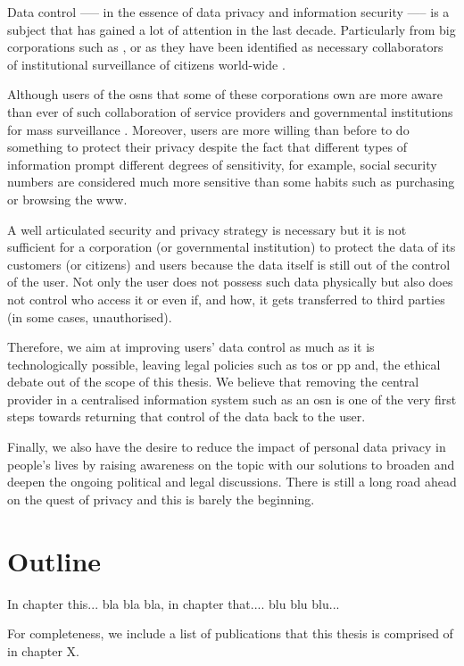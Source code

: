 \documentclass[showtrims]{kthesis}
\begin{document}
Data control —-- in the essence of data privacy and information security —-- is a 
subject that has gained a lot of attention in the last decade. Particularly from 
big corporations such as \Google, \Apple or \Facebook as they have been identified 
as necessary collaborators of institutional surveillance of citizens world-wide \cite{Lyon14}.

Although users of the \acp{osn} that some of these corporations own are more aware 
than ever of such collaboration of service providers and governmental institutions 
for mass surveillance \cite{Madden14}. Moreover, users are more willing than before 
to do something to protect their privacy despite the fact that different types of 
information prompt different degrees of sensitivity, for example, social security 
numbers are considered much more sensitive than some habits such as purchasing or 
browsing the \ac{www}.

A well articulated security and privacy strategy is necessary but it is not sufficient 
for a corporation (or governmental institution) to protect the data of its customers 
(or citizens) and users because the data itself is still out of the control of the 
user. Not only the user does not possess such data physically but also does not 
control who access it or even if, and how, it gets transferred to third parties 
(in some cases, unauthorised).

Therefore, we aim at improving users' data control as much as it is technologically 
possible, leaving legal policies such as \ac{tos} or \ac{pp} and, the ethical debate 
out of the scope of this thesis. We believe that removing the central provider in 
a centralised information system such as an \ac{osn} is one of the very first steps 
towards returning that control of the data back to the user.

Finally, we also have the desire to reduce the impact of personal data privacy in 
people's lives by raising awareness on the topic with our solutions to broaden and 
deepen the ongoing political and legal discussions. There is still a long road ahead 
on the quest of privacy and this is barely the beginning.

\section{Outline}
In chapter this... bla bla bla, in chapter that.... blu blu blu...

For completeness, we include a list of publications that this thesis is comprised 
of in chapter X. 
\end{document}
